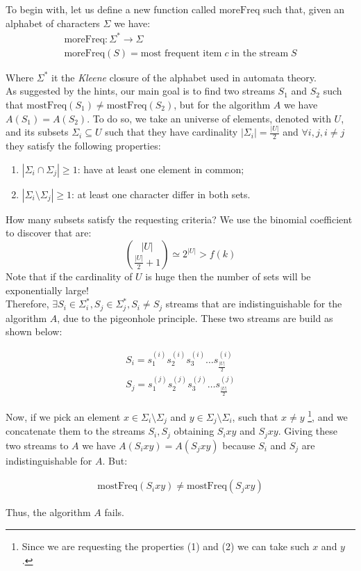 \documentclass{article}
\begin{document}
To begin with, let us define a new function called $\textrm{moreFreq}$ such that, given an alphabet of characters $\Sigma$ we have:
\begin{gather*}
    \textrm{moreFreq}: \Sigma^{*} \to \Sigma \\
    \textrm{moreFreq}(S) = \textrm{most frequent item} \; c \; \textrm{in the stream} \; S
\end{gather*}

\noindent Where $\Sigma^{*}$ it the \textit{Kleene} closure of the alphabet used in automata theory.\\

\noindent As suggested by the hints, our main goal is to find two streams $S_1$ and $S_2$ such that $\textrm{mostFreq}(S_1) \ne \textrm{mostFreq}(S_2)$, 
but for the algorithm $A$ we have $A(S_1) = A(S_2)$. To do so, we take an universe of elements, denoted with $U$, and its subsets $\Sigma_i \subseteq U$ such
that they have cardinality $|\Sigma_i| = \frac{|U|}{2}$ and $\forall i, j, i \ne j$ they satisfy the following properties:
\begin{enumerate}
    \item $|\Sigma_i \cap \Sigma_j| \ge 1$: have at least one element in common;
    \item $|\Sigma_i \setminus \Sigma_j| \ge 1$: at least one character differ in both sets.
\end{enumerate}

\noindent How many subsets satisfy the requesting criteria? We use the binomial coefficient to discover that are:
\begin{equation}
    \binom{|U|}{\frac{|U|}{2} + 1} \simeq 2^{|U|} > f(k)
\end{equation}
Note that if the cardinality of $U$ is huge then the number of sets will be exponentially large!\\

\noindent Therefore, $\exists S_i \in \Sigma_{i}^*, S_j \in \Sigma_{j}^{*}, S_i \ne S_j$ streams that are indistinguishable for the algorithm $A$, due to the pigeonhole principle.
These two streams are build as shown below:

\begin{align}
S_i = s_1^{(i)}s_2^{(i)}s_3^{(i)} \dots s_{\frac{|U|}{2}}^{(i)} \\
S_j = s_1^{(j)}s_2^{(j)}s_3^{(j)} \dots s_{\frac{|U|}{2}}^{(j)}
\end{align}

\noindent Now, if we pick an element $x \in \Sigma_i \setminus \Sigma_j$ and $y \in \Sigma_j \setminus \Sigma_i$, such that $x \ne y$ \footnote{Since we are requesting the properties (1) and (2) we can take such $x$ and $y$.}, and we concatenate them to 
the streams $S_i, S_j$ obtaining $S_ixy$ and $S_jxy$. Giving these two streams to $A$ we have $A(S_i xy) = A(S_j xy)$ because $S_i$ and $S_j$ are
indistinguishable for $A$. But:

\begin{align*}
    \textrm{mostFreq}(S_i xy) \ne \textrm{mostFreq}(S_j xy)
\end{align*}

\noindent Thus, the algorithm $A$ fails.
\end{document}
